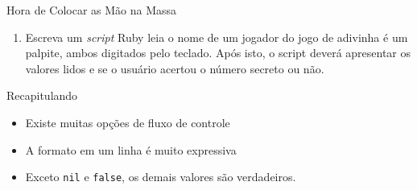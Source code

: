 \begin{frame}{Hora de Colocar as Mão na Massa}
  \begin{enumerate}
    \item Escreva um \textit{script} Ruby leia o nome de um jogador do jogo de adivinha é um 
    palpite, ambos digitados pelo teclado. Após isto, o script deverá apresentar os valores lidos e se 
    o usuário acertou o número secreto ou não.
  \end{enumerate}
  \framebreak
\end{frame}
\begin{frame}[fragile,t]{Recapitulando}
  \begin{itemize}
    \item Existe muitas opções de fluxo de controle
    \item A formato em um linha é muito expressiva
    \item Exceto \verb!nil! e \verb!false!, os demais valores são verdadeiros.
  \end{itemize}
\end{frame}



